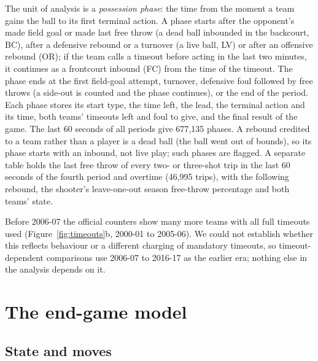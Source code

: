 \documentclass[article]{jdssv}
\newcommand{\BC}{\textsf{BC}}
\newcommand{\FC}{\textsf{FC}}
\newcommand{\LV}{\textsf{LV}}
\newcommand{\OR}{\textsf{OR}}
\begin{document}
The unit of analysis is a \emph{possession phase}: the time from the moment a team gains the ball to its
first terminal action. A phase starts after the opponent's made field goal or made last free throw (a dead
ball inbounded in the backcourt, \BC), after a defensive rebound or a turnover (a live ball, \LV) or after an
offensive rebound (\OR); if the team calls a timeout before acting in the last two minutes, it continues as a
frontcourt inbound (\FC) from the time of the timeout. The phase ends at the first field-goal attempt,
turnover, defensive foul followed by free throws (a side-out is counted and the phase continues), or the end
of the period. Each phase stores its start type, the time left, the lead, the terminal action and its
time, both teams' timeouts left and foul to give, and the final result of the game. The last 60 seconds of
all periods give 677{,}135 phases. A rebound credited to a team rather than a player is a dead ball (the ball went
out of bounds), so its phase starts with an inbound, not live play; such phases are flagged. A separate table holds the last free throw of every two- or three-shot
trip in the last 60 seconds of the fourth period and overtime (46{,}995 trips), with the following rebound, the shooter's
leave-one-out season free-throw percentage and both teams' state.

Before 2006-07 the official counters show many more teams with all full timeouts used
(Figure~\ref{fig:timeouts}b, 2000-01 to 2005-06). We could not establish whether this reflects behaviour or a
different charging of mandatory timeouts, so timeout-dependent comparisons use 2006-07 to 2016-17 as the
earlier era; nothing else in the analysis depends on it.

\section{The end-game model} \label{sec:model}

\subsection{State and moves}
\end{document}
